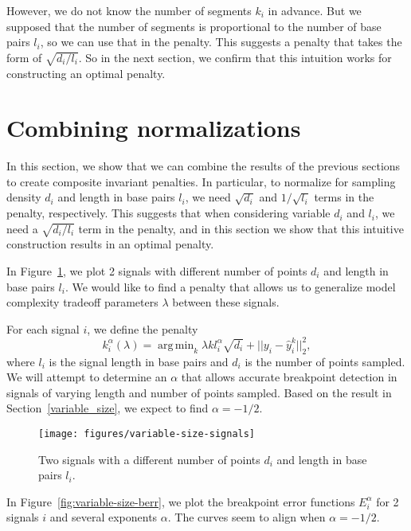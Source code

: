 \documentclass{jsfds} %
\DeclareMathOperator*{\argmin}{arg\,min}
\begin{document}
However, we do not know the number of segments $k_i$ in advance. But
we supposed that the number of segments is proportional to the number
of base pairs $l_i$, so we can use that in the penalty. This suggests
a penalty that takes the form of $\sqrt{d_i/l_i}$. So in the next
section, we confirm that this intuition works for constructing an
optimal penalty.


\newpage
\section{Combining normalizations}
\label{combining_penalties}
In this section, we show that we can combine the results of the
previous sections to create composite invariant penalties. In
particular, to normalize for sampling density $d_i$ and length in base
pairs $l_i$, we need $\sqrt{d_i}$ and $1/\sqrt{l_i}$ terms in the
penalty, respectively. This suggests that when considering variable
$d_i$ and $l_i$, we need a $\sqrt{d_i/l_i}$ term in the penalty, and
in this section we show that this intuitive construction results in an
optimal penalty.

In Figure~\ref{fig:variable-size-signals}, we plot 2 signals with
different number of points $d_i$ and length in base pairs $l_i$. We
would like to find a penalty that allows us to generalize model
complexity tradeoff parameters $\lambda$ between these signals.

For each signal $i$, we define the penalty
\begin{equation}
  \label{eq:kstar_composite}
  k_i^\alpha(\lambda) = \argmin_k \lambda k l_i^\alpha \sqrt{d_i}
  + ||y_i - \hat y_i^k||^2_2,
\end{equation}
where $l_i$ is the signal length in base pairs and $d_i$ is the number
of points sampled. We will attempt to determine an $\alpha$ that
allows accurate breakpoint detection in signals of varying length and
number of points sampled. Based on the result in
Section~\ref{variable_size}, we expect to find $\alpha=-1/2$.

\begin{figure}[H]
  \centering
\texttt{[image: figures/variable-size-signals]}
  \caption{Two signals with a different number of
    points $d_i$ and length in base pairs $l_i$.}
\label{fig:variable-size-signals}
\end{figure}

\newpage

In Figure~\ref{fig:variable-size-berr}, we plot the breakpoint error
functions $E_i^\alpha$ for 2 signals $i$ and several exponents
$\alpha$. The curves seem to align when $\alpha=-1/2$.
\end{document}
